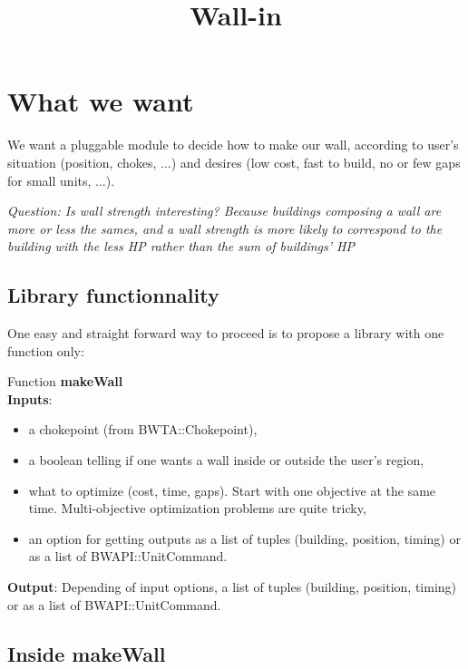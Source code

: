 \documentclass[11pt]{article}
\begin{document}
  
\title{Wall-in}
\author{}

\maketitle



\section{What we want}

We want a  pluggable module to decide how to  make our wall, according
to  user's situation (position,  chokes, ...)  and desires  (low cost,
fast to build, no or few gaps for small units, ...).

{\it  Question:  Is   wall  strength  interesting?  Because  buildings
  composing a wall are more or  less the sames, and a wall strength is
  more likely  to correspond to the  building with the  less HP rather
  than the sum of buildings' HP}

\subsection{Library functionnality}

One easy and  straight forward way to proceed is  to propose a library
with one function only:

\noindent
Function {\bf makeWall}\\
{\bf Inputs}:
\begin{itemize}
\item a chokepoint (from BWTA::Chokepoint), 
\item a  boolean telling  if one  wants a wall  inside or  outside the
  user's region,
\item what to  optimize (cost, time, gaps).  Start  with one objective
  at the  same time.  Multi-objective optimization problems  are quite
  tricky,
\item an  option for  getting outputs as  a list of  tuples (building,
  position, timing) or as a list of BWAPI::UnitCommand.
\end{itemize}
{\bf Output}: Depending of input options, a list of tuples (building,
position, timing) or as a list of BWAPI::UnitCommand.


\subsection{Inside makeWall}
\end{document}
